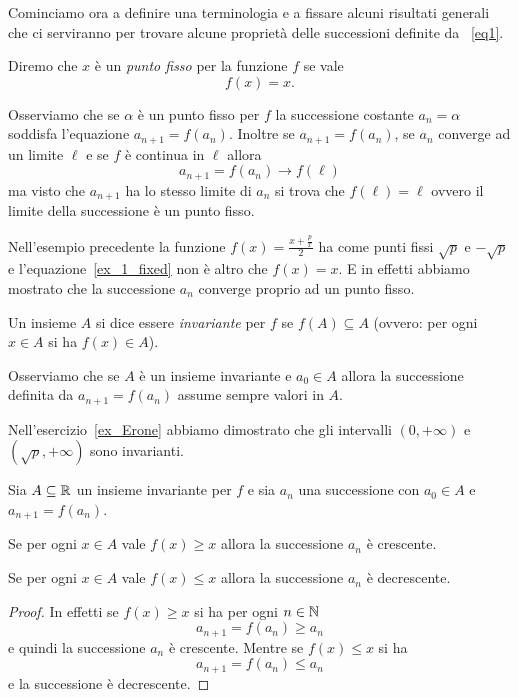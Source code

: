 Cominciamo ora a definire una terminologia e a fissare alcuni
risultati generali che ci serviranno per trovare alcune proprietà
delle successioni definite da~ \eqref{eq1}.

\begin{definition}
\mymark{**}%
  Diremo che $x$ è un \emph{punto fisso}%
  per la funzione $f$ se vale
  \[
    f(x) = x.
  \]
\end{definition}
Osserviamo che se $\alpha$ è un punto fisso per $f$ la successione costante
$a_n=\alpha$ soddisfa l'equazione $a_{n+1} = f(a_n)$. Inoltre se
$a_{n+1} = f(a_n)$, se $a_n$ converge ad un limite $\ell$ e se
$f$ è continua in $\ell$ allora
\[
a_{n+1} = f(a_n) \to f(\ell)
\]
ma visto che $a_{n+1}$ ha lo stesso limite di $a_n$ si trova che
$f(\ell)=\ell$ ovvero il limite della successione è un punto fisso.

Nell'esempio precedente la funzione $f(x) = \frac{x+\frac p x}2$ ha come punti
fissi $\sqrt{p}$ e $-\sqrt{p}$ e l'equazione~\eqref{ex_1_fixed} non è
altro che $f(x)=x$. E in effetti abbiamo mostrato che la successione
$a_n$ converge proprio ad un punto fisso.

\begin{definition}
\mymark{**}%
  Un insieme $A$ si dice essere \emph{invariante}
%
  per $f$ se
  $f(A)\subseteq A$
  (ovvero: per ogni $x\in A$ si ha $f(x)\in A$).
\end{definition}

Osserviamo che se $A$ è un insieme invariante e $a_0\in A$ allora la
successione definita da $a_{n+1}=f(a_n)$ assume sempre valori in $A$.

Nell'esercizio~\ref{ex_Erone} abbiamo dimostrato che gli intervalli
$(0,+\infty)$ e $(\sqrt{p},+\infty)$ sono invarianti.

\begin{theorem}\label{th_1}
\mymark{*}%
  Sia $A\subseteq {\mathbb R}$ un insieme invariante per $f$ e sia $a_n$ una
  successione con $a_0 \in A$ e $a_{n+1}=f(a_n)$.

  Se per ogni $x\in A$
  vale $f(x) \ge x$
  allora la successione $a_n$ è crescente.

  Se per ogni $x\in A$ vale $f(x) \le x$
  allora la successione $a_n$ è decrescente.
\end{theorem}
\begin{proof}
\mymark{*}%
  In effetti se $f(x) \ge x$ si ha per ogni $n\in {\mathbb N}$
  \[
  a_{n+1} = f(a_n) \ge a_n
  \]
e quindi la successione $a_n$ è crescente. Mentre se $f(x) \le x$ si ha
  \[
  a_{n+1} = f(a_n) \le a_n
  \]
e la successione è decrescente.
\end{proof}

